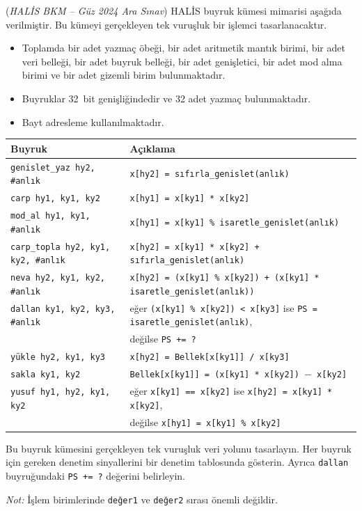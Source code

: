 
\begin{alistirma}[\zor]
(\emph{HALİS BKM -- Güz 2024 Ara Sınav})
HALİS buyruk kümesi mimarisi aşağıda verilmiştir. Bu kümeyi gerçekleyen tek vuruşluk bir işlemci tasarlanacaktır.
\begin{itemize}
    \item Toplamda bir adet yazmaç öbeği, bir adet aritmetik mantık birimi, bir adet veri belleği, bir adet buyruk belleği, bir adet genişletici, bir adet mod alma birimi ve bir adet gizemli birim bulunmaktadır.
    \item Buyruklar 32~bit genişliğindedir ve 32 adet yazmaç bulunmaktadır.
    \item Bayt adresleme kullanılmaktadır.
\end{itemize}

\begin{center}
\small
\begin{tabular}{ll}
\toprule
\textbf{Buyruk} & \textbf{Açıklama} \\
\midrule
\texttt{genislet\_yaz hy2, \#anlık} & \texttt{x[hy2] = sıfırla\_genislet(anlık)} \\
\texttt{carp hy1, ky1, ky2} & \texttt{x[hy1] = x[ky1] * x[ky2]} \\
\texttt{mod\_al hy1, ky1, \#anlık} & \texttt{x[hy1] = x[ky1] \% isaretle\_genislet(anlık)} \\
\texttt{carp\_topla hy2, ky1, ky2, \#anlık} & \texttt{x[hy2] = x[ky1] * x[ky2] + sıfırla\_genislet(anlık)} \\
\texttt{neva hy2, ky1, ky2, \#anlık} & \texttt{x[hy2] = (x[ky1] \% x[ky2]) + (x[ky1] * isaretle\_genislet(anlık))} \\
\texttt{dallan ky1, ky2, ky3, \#anlık} & eğer \texttt{(x[ky1] \% x[ky2]) < x[ky3]} ise \texttt{PS = isaretle\_genislet(anlık)}, \\
 & değilse \texttt{PS += ?} \\
\texttt{yükle hy2, ky1, ky3} & \texttt{x[hy2] = Bellek[x[ky1]] / x[ky3]} \\
\texttt{sakla ky1, ky2} & \texttt{Bellek[x[ky1]] = (x[ky1] * x[ky2]) $-$ x[ky2]} \\
\texttt{yusuf hy1, hy2, ky1, ky2} & eğer \texttt{x[ky1] == x[ky2]} ise \texttt{x[hy2] = x[ky1] * x[ky2]}, \\
 & değilse \texttt{x[hy1] = x[ky1] \% x[ky2]} \\
\bottomrule
\end{tabular}
\end{center}

Bu buyruk kümesini gerçekleyen tek vuruşluk veri yolunu tasarlayın. Her buyruk için gereken denetim sinyallerini bir denetim tablosunda gösterin. Ayrıca \texttt{dallan} buyruğundaki \texttt{PS += ?} değerini belirleyin.

\emph{Not:} İşlem birimlerinde \texttt{değer1} ve \texttt{değer2} sırası önemli değildir.
\end{alistirma}

